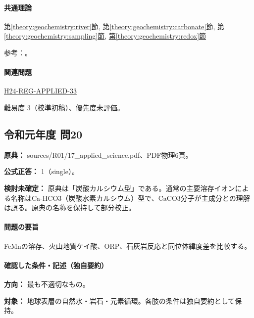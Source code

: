 \paragraph{共通理論} \hyperref[theory:geochemistry:river]{第\ref*{theory:geochemistry:river}節}, \hyperref[theory:geochemistry:carbonate]{第\ref*{theory:geochemistry:carbonate}節}, \hyperref[theory:geochemistry:sampling]{第\ref*{theory:geochemistry:sampling}節}, \hyperref[theory:geochemistry:redox]{第\ref*{theory:geochemistry:redox}節}

\par 参考：\cite{gc_river1970,gc_hem,gc_redox,gc_mine}。

\paragraph{関連問題} \hyperref[q:h24-reg-applied-33]{H24-REG-APPLIED-33}

\par 難易度 3（校準初稿）、優先度未評価。

\subsection{令和元年度 問20}
\label{q:r01-reg-applied-20}

\noindent\textbf{原典：} sources/R01/17\_applied\_science.pdf、PDF物理6頁。

\textbf{公式正答：} 1（single）。

\par\textbf{検討未確定：} 原典は「炭酸カルシウム型」である。通常の主要溶存イオンによる名称はCa-HCO3（炭酸水素カルシウム）型で、CaCO3分子が主成分との理解は誤る。原典の名称を保持して部分校正。

\paragraph{問題の要旨} FeMnの溶存、火山地質ケイ酸、ORP、石灰岩反応と同位体緯度差を比較する。

\paragraph{確認した条件・記述（独自要約）}\mbox{}\par

\noindent\textbf{方向：} 最も不適切なもの。\par

\noindent\textbf{対象：} 地球表層の自然水・岩石・元素循環。各肢の条件は独自要約として保持。\par

